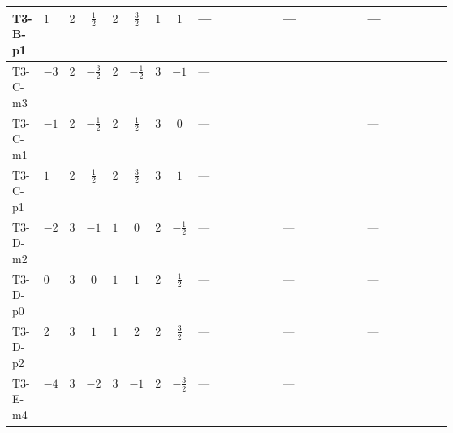 \documentclass[8pt]{article}
\begin{document}
\begin{landscape}
\begin{longtable}{@{}llcccccc >{\raggedright\arraybackslash}p{0.21\linewidth} >{\raggedright\arraybackslash}p{0.21\linewidth} >{\raggedright\arraybackslash}p{0.21\linewidth}@{}}
\midrule
T3-B-p1 & $1$ & $2$ & $\frac{1}{2}$ & $2$ & $\frac{3}{2}$ & $1$ & $1$ & --- & --- & --- \\
\midrule
T3-C-m3 & $-3$ & $2$ & $-\frac{3}{2}$ & $2$ & $-\frac{1}{2}$ & $3$ & $-1$ & --- & \scriptsize\adjustbox{max width=\linewidth}{$\begin{gathered} \frac{3}{2} T_{\nu}^{(1)} \left({y_1}\right)_{ij}\end{gathered}$} & \scriptsize\adjustbox{max width=\linewidth}{$\begin{gathered} +\frac{1}{4} (3 \left({y_2}\,\left({y_2}\right)^{\dagger}\,{y_1}\right)_{ij}+2 \left({Y_e}\,\left({Y_e}\right)^{\dagger}\,{y_1}\right)_{ij}+5 \left({y_1}\,\left({y_1}\right)^{\dagger}\,{y_1}\right)_{ij})\end{gathered}$} \\
\midrule
T3-C-m1 & $-1$ & $2$ & $-\frac{1}{2}$ & $2$ & $\frac{1}{2}$ & $3$ & $0$ & --- & \scriptsize\adjustbox{max width=\linewidth}{$\begin{gathered} +\frac{3}{2} T_{\nu}^{(1)} \left({y_1}\right)_{ij}\end{gathered}$} & --- \\
\midrule
T3-C-p1 & $1$ & $2$ & $\frac{1}{2}$ & $2$ & $\frac{3}{2}$ & $3$ & $1$ & --- & \scriptsize\adjustbox{max width=\linewidth}{$\begin{gathered} \frac{3}{2} T_{\nu}^{(1)} \left({y_1}\right)_{ij}\end{gathered}$} & \scriptsize\adjustbox{max width=\linewidth}{$\begin{gathered} +\frac{1}{4} (3 \left({y_2}\,\left({y_2}\right)^{\dagger}\,{y_1}\right)_{ij}+2 \left({Y_e}\,\left({Y_e}\right)^{\dagger}\,{y_1}\right)_{ij}+5 \left({y_1}\,\left({y_1}\right)^{\dagger}\,{y_1}\right)_{ij})\end{gathered}$} \\
\midrule
T3-D-m2 & $-2$ & $3$ & $-1$ & $1$ & $0$ & $2$ & $-\frac{1}{2}$ & --- & --- & --- \\
\midrule
T3-D-p0 & $0$ & $3$ & $0$ & $1$ & $1$ & $2$ & $\frac{1}{2}$ & --- & --- & --- \\
\midrule
T3-D-p2 & $2$ & $3$ & $1$ & $1$ & $2$ & $2$ & $\frac{3}{2}$ & --- & --- & --- \\
\midrule
T3-E-m4 & $-4$ & $3$ & $-2$ & $3$ & $-1$ & $2$ & $-\frac{3}{2}$ & --- & --- & \scriptsize\adjustbox{max width=\linewidth}{$\begin{gathered} +\frac{1}{4} (3 \left({y_2}\,\left({y_2}\right)^{\dagger}\,{y_1}\right)_{ij}+2 \left({Y_e}\,\left({Y_e}\right)^{\dagger}\,{y_1}\right)_{ij}+6 \left({y_1}\,\left({y_1}\right)^{\dagger}\,{y_1}\right)_{ij})\end{gathered}$} \\

\end{longtable}
\end{landscape}
\end{document}
